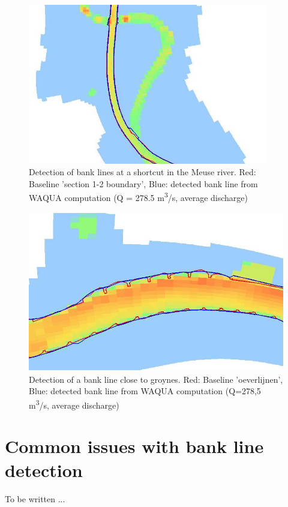 \begin{figure}[!h]
\includegraphics[width=\textwidth,height=7cm]{figures/Fig3-2.png}
\caption{Detection of bank lines at a shortcut in the Meuse river.
Red: Baseline 'section 1-2 boundary', Blue: detected bank line from WAQUA computation (Q = 278.5 m\textsuperscript{3}/s, average discharge)}
\label{Fig3.2}
\end{figure}

\begin{figure}[!hb]
\includegraphics[width=\textwidth,height=7cm]{figures/Fig3-3.png}
\caption{Detection of a bank line close to groynes.
Red: Baseline 'oeverlijnen', Blue: detected bank line from WAQUA computation (Q=278,5 m\textsuperscript{3}/s, average discharge)}
\label{Fig3.3}
\vspace{-0.75cm} 
\end{figure}
\clearpage

\section{Common issues with bank line detection} \label{Sec:DetectIssues}

To be written ...

